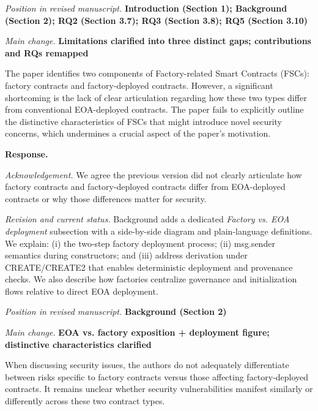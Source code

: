 \documentclass[acmsmall]{acmart}
\begin{document}
	\textit{Position in revised manuscript.}
	{\color{red}\textbf{Introduction (Section 1); Background (Section 2); RQ2 (Section 3.7); RQ3 (Section 3.8); RQ5 (Section 3.10)}}

	\textit{Main change.}
	{\color{blue}\textbf{Limitations clarified into three distinct gaps; contributions and RQs remapped}}

	\begin{tcolorbox}
		[commentbox,title=Reviewer \#3 -- Comment 2] The paper identifies two components of Factory-related
		Smart Contracts (FSCs): factory contracts and factory-deployed contracts. However, a
		significant shortcoming is the lack of clear articulation regarding how these two types
		differ from conventional EOA-deployed contracts. The paper fails to explicitly outline the distinctive
		characteristics of FSCs that might introduce novel security concerns, which undermines a
		crucial aspect of the paper's motivation.
	\end{tcolorbox}

	\noindent
	\textbf{Response.}

	\textit{Acknowledgement.} We agree the previous version did not clearly articulate how factory contracts
	and factory-deployed contracts differ from EOA-deployed contracts or why those differences matter
	for security.

	\textit{Revision and current status.} Background adds a dedicated \emph{Factory vs. EOA deployment}
	subsection with a side-by-side diagram and plain-language definitions. We explain: (i) the two-step
	factory deployment process; (ii) msg.sender semantics during constructors; and (iii) address derivation
	under CREATE/CREATE2 that enables deterministic deployment and provenance checks. We also
	describe how factories centralize governance and initialization flows relative to direct EOA
	deployment.

	\textit{Position in revised manuscript.} {\color{red}\textbf{Background (Section 2)}}

	\textit{Main change.} {\color{blue}\textbf{EOA vs. factory exposition + deployment figure; distinctive characteristics clarified}}

	\begin{tcolorbox}
		[commentbox,title=Reviewer \#3 -- Comment 3] When discussing security issues, the authors do
		not adequately differentiate between risks specific to factory contracts versus those
		affecting factory-deployed contracts. It remains unclear whether security vulnerabilities manifest
		similarly or differently across these two contract types.
	\end{tcolorbox}
\end{document}
